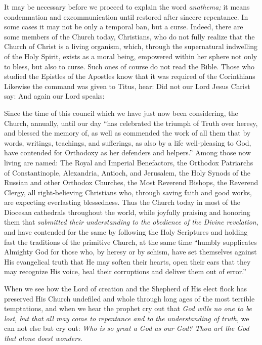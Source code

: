 It may be necessary before we proceed to explain
the word \textit{anathema;} it means condemnation
and excommunication until restored after 
sincere repentance. In some cases it may not 
be only a temporal ban, but a curse. Indeed, 
there are some members of the Church today, 
Christians, who do not fully realize that the 
Church of Christ is a living organism, which, 
through the supernatural indwelling of the 
Holy Spirit, exists as a moral being, empowered
within her sphere not only to bless, but also to 
curse. Such ones of course do not read the 
Bible. Those who studied the Epistles of the 
Apostles know that it was required of the Corinthians
 Likewise the 
command was given to Titus, hear:  Did not our Lord 
Jesus Christ say:  And 
again our Lord speaks:  

Since the time of this council which we have 
just now been considering, the Church, annually, 
until our day ``has celebrated the triumph of 
Truth over heresy, and blessed the memory of, 
as well as commended the work of all them that 
by words, writings, teachings, and sufferings, as 
also by a life well-pleasing to God, have contended
for Orthodoxy as her defenders and 
helpers.'' Among those now living are named: 
The Royal and Imperial Benefactors, the Orthodox
Patriarchs of Constantinople, Alexandria, 
Antioch, and Jerusalem, the Holy Synods of the
Russian and other Orthodox Churches, the Most 
Reverend Bishops, the Reverend Clergy, all 
right-believing Christians who, through saving 
faith and good works, are expecting everlasting 
blessedness. Thus the Church today in most 
of the Diocesan cathedrals throughout the 
world, while joyfully praising and honoring 
them that \textit{submitted their understanding to the 
obedience of the Divine revelation}, and have 
contended for the same by following the Holy 
Scriptures and holding fast the traditions of the 
primitive Church, at the same time ``humbly 
supplicates Almighty God for those who, by 
heresy or by schism, have set themselves against 
His evangelical truth that He may soften their 
hearts, open their ears that they may recognize 
His voice, heal their corruptions and deliver 
them out of error.'' 

When we see how the Lord of creation and 
the Shepherd of His elect flock has preserved 
His Church undefiled and whole through long 
ages of the most terrible temptations, and when 
we hear the prophet cry out that \textit{God wills 
no one to be lost, but that all may come to repentance
and to the understanding of truth}, we 
can not else but cry out: \textit{Who is so great a 
God as our God? Thou art the God that alone 
doest wonders}.
